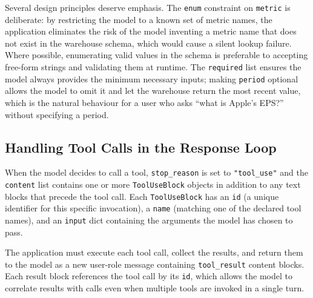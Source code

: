 Several design principles deserve emphasis. The \texttt{enum} constraint on
\texttt{metric} is deliberate: by restricting the model to a known set of metric names,
the application eliminates the risk of the model inventing a metric name that does not
exist in the warehouse schema, which would cause a silent lookup failure. Where
possible, enumerating valid values in the schema is preferable to accepting free-form
strings and validating them at runtime. The \texttt{required} list ensures the model
always provides the minimum necessary inputs; making \texttt{period} optional allows
the model to omit it and let the warehouse return the most recent value, which is the
natural behaviour for a user who asks ``what is Apple's EPS?'' without specifying a
period.

\subsection{Handling Tool Calls in the Response Loop}
\label{app:sdk-commercial:tools:loop}

When the model decides to call a tool, \texttt{stop\_reason} is set to
\texttt{"tool\_use"} and the \texttt{content} list contains one or more
\texttt{ToolUseBlock} objects in addition to any text blocks that precede the tool call.
Each \texttt{ToolUseBlock} has an \texttt{id} (a unique identifier for this specific
invocation), a \texttt{name} (matching one of the declared tool names), and an
\texttt{input} dict containing the arguments the model has chosen to pass.

The application must execute each tool call, collect the results, and return them to
the model as a new user-role message containing \texttt{tool\_result} content blocks.
Each result block references the tool call by its \texttt{id}, which allows the model
to correlate results with calls even when multiple tools are invoked in a single turn.

